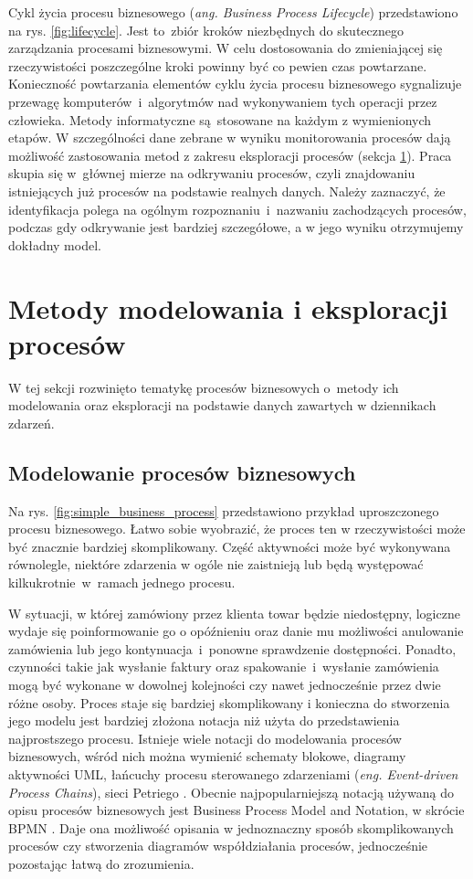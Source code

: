 Cykl życia procesu biznesowego (\textit{ang. Business Process Lifecycle}) przedstawiono na rys. \ref{fig:lifecycle}. Jest to~zbiór kroków niezbędnych do skutecznego zarządzania procesami biznesowymi. W celu dostosowania do zmieniającej się rzeczywistości poszczególne kroki powinny być co pewien czas powtarzane. Konieczność powtarzania elementów cyklu życia procesu biznesowego sygnalizuje przewagę komputerów~i~algorytmów nad wykonywaniem tych operacji przez człowieka. Metody informatyczne są~stosowane na każdym z wymienionych etapów. W szczególności dane zebrane w wyniku monitorowania procesów dają możliwość zastosowania metod z zakresu eksploracji procesów (sekcja \ref{sec:eksploracja}). Praca skupia się w~głównej mierze na odkrywaniu procesów, czyli znajdowaniu istniejących już procesów na podstawie realnych danych. Należy zaznaczyć, że identyfikacja polega na ogólnym rozpoznaniu~i~nazwaniu zachodzących procesów, podczas gdy odkrywanie jest bardziej szczegółowe, a w jego wyniku otrzymujemy dokładny model.  


\section{Metody modelowania i eksploracji procesów}
\label{sec:eksploracja}
W tej sekcji rozwinięto tematykę procesów biznesowych o~metody ich modelowania oraz eksploracji na podstawie danych zawartych w dziennikach zdarzeń.

\subsection{Modelowanie procesów biznesowych}
\label{sec:modelling}
Na rys. \ref{fig:simple_business_process} przedstawiono przykład uproszczonego procesu biznesowego. Łatwo sobie wyobrazić, że proces ten w rzeczywistości może być znacznie bardziej skomplikowany. Część aktywności może być wykonywana równolegle, niektóre zdarzenia w ogóle nie zaistnieją lub będą występować kilkukrotnie~w~ramach jednego procesu. 

W sytuacji, w której zamówiony przez klienta towar będzie niedostępny, logiczne wydaje się poinformowanie go o opóźnieniu oraz danie mu możliwości anulowanie zamówienia lub jego kontynuacja~i~ponowne sprawdzenie dostępności. Ponadto, czynności takie jak wysłanie faktury oraz spakowanie~i~wysłanie zamówienia mogą być wykonane w dowolnej kolejności czy nawet jednocześnie przez dwie różne osoby. Proces staje się bardziej skomplikowany i konieczna do stworzenia jego modelu jest bardziej złożona notacja niż użyta do przedstawienia najprostszego procesu. 
Istnieje wiele notacji do modelowania procesów biznesowych, wśród nich można wymienić schematy blokowe, diagramy aktywności UML, łańcuchy procesu sterowanego zdarzeniami (\textit{eng. Event-driven Process Chains}), sieci Petriego \cite{BPMComparission}. Obecnie najpopularniejszą notacją używaną do opisu procesów biznesowych jest Business Process  Model and Notation, w skrócie BPMN \cite{omg2011bpmn}. Daje ona możliwość opisania w jednoznaczny sposób skomplikowanych procesów czy stworzenia diagramów współdziałania procesów, jednocześnie pozostając łatwą do zrozumienia.

